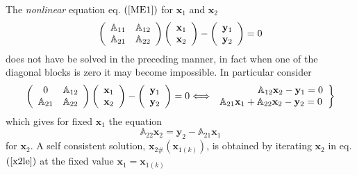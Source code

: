 \documentclass[aps,preprint]{revtex4}%
\begin{document}
The \emph{nonlinear }equation eq. $\left(  \ref{ME1}\right)  $ for
$\mathbf{x}_{1}$ and $\mathbf{x}_{2}$
\begin{equation}
\left(
\begin{array}
[c]{cc}%
\mathbb{A}_{11} & \mathbb{A}_{12}\\
\mathbb{A}_{21} & \mathbb{A}_{22}%
\end{array}
\right)  \left(
\begin{array}
[c]{c}%
\mathbf{x}_{1}\\
\mathbf{x}_{2}%
\end{array}
\right)  -\left(
\begin{array}
[c]{c}%
\mathbf{y}_{1}\\
\mathbf{y}_{2}%
\end{array}
\right)  =0
\end{equation}
does not have be solved in the preceding manner, in fact when one of the
diagonal blocks is zero it may become impossible. In particular consider
\begin{equation}
\left(
\begin{array}
[c]{cc}%
0 & \mathbb{A}_{12}\\
\mathbb{A}_{21} & \mathbb{A}_{22}%
\end{array}
\right)  \left(
\begin{array}
[c]{c}%
\mathbf{x}_{1}\\
\mathbf{x}_{2}%
\end{array}
\right)  -\left(
\begin{array}
[c]{c}%
\mathbf{y}_{1}\\
\mathbf{y}_{2}%
\end{array}
\right)  =0\Longleftrightarrow\left.
\begin{array}
[c]{c}%
\qquad\qquad\mathbb{A}_{12}\mathbf{x}_{2}-\mathbf{y}_{1}=0\\
\mathbb{A}_{21}\mathbf{x}_{1}+\mathbb{A}_{22}\mathbf{x}_{2}-\mathbf{y}_{2}=0
\end{array}
\right\}
\end{equation}
which gives for fixed $\mathbf{x}_{1}$ the equation
\begin{equation}
\mathbb{A}_{22}\mathbf{x}_{2}=\mathbf{y}_{2}-\mathbb{A}_{21}\mathbf{x}_{1}
\label{x2le}%
\end{equation}
for $\mathbf{x}_{2}$. A self consistent solution, $\mathbf{x}_{2\#}\left(
\mathbf{x}_{1\left(  k\right)  }\right)  $, is obtained by iterating
$\mathbf{x}_{2}$ in eq. $\left(  \ref{x2le}\right)  $ at the fixed value
$\mathbf{x}_{1}=\mathbf{x}_{1\left(  k\right)  }$
\end{document}
